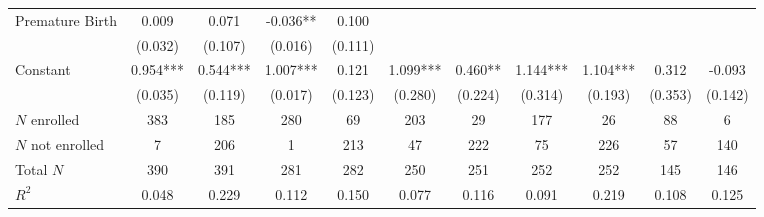 \begin{tabular}{lcccccccccc}
Premature Birth & 0.009 & 0.071 & -0.036** & 0.100 &  &  &  &  &  &  \\
 & (0.032) & (0.107) & (0.016) & (0.111) &  &  &  &  &  &  \\
Constant & 0.954*** & 0.544*** & 1.007*** & 0.121 & 1.099*** & 0.460** & 1.144*** & 1.104*** & 0.312 & -0.093 \\
 & (0.035) & (0.119) & (0.017) & (0.123) & (0.280) & (0.224) & (0.314) & (0.193) & (0.353) & (0.142) \\
\midrule
$N$ enrolled & 383 & 185 & 280 & 69 & 203 & 29 & 177 & 26 & 88 & 6 \\
$N$ not enrolled & 7 & 206 & 1 & 213 & 47 & 222 & 75 & 226 & 57 & 140 \\
Total $N$ & 390 & 391 & 281 & 282 & 250 & 251 & 252 & 252 & 145 & 146 \\
$R^2$ & 0.048 & 0.229 & 0.112 & 0.150 & 0.077 & 0.116 & 0.091 & 0.219 & 0.108 & 0.125 \\ \bottomrule
\end{tabular}
